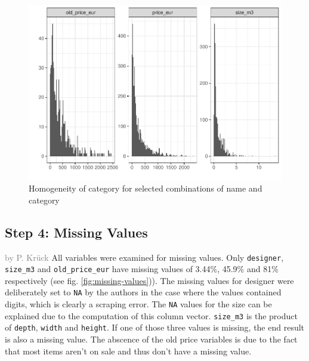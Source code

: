 \documentclass[a4paper, nobind]{templates/ociamthesis}
\begin{document}
\begin{figure}[!h]
\includegraphics[width=1\linewidth]{_main_files/figure-latex/normality-1} \caption{Homogeneity of category for selected combinations of name and category}\label{fig:normality}
\end{figure}

\hypertarget{step-4-missing-values}{%
\subsection{Step 4: Missing Values}\label{step-4-missing-values}}

\textcolor{gray}{by P. Krück}
All variables were examined for missing values. Only \texttt{designer}, \texttt{size\_m3} and \texttt{old\_price\_eur} have missing values of 3.44\%, 45.9\% and 81\% respectively (see fig. \ref{fig:missing-values})).
The missing values for designer were deliberately set to \texttt{NA} by the authors in the case where the values contained digits, which is clearly a scraping error.
The \texttt{NA} values for the size can be explained due to the computation of this column vector. \texttt{size\_m3} is the product of \texttt{depth}, \texttt{width} and \texttt{height}. If one of those three values is missing, the end result is also a missing value.
The abscence of the old price variables is due to the fact that most items aren't on sale and thus don't have a missing value.
\end{document}
